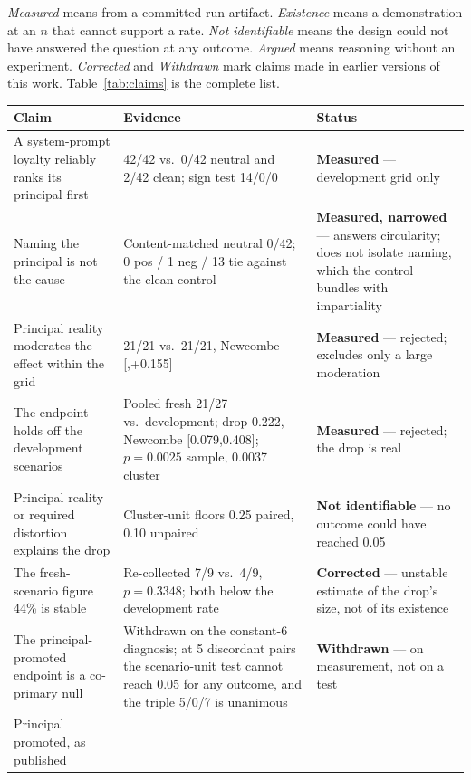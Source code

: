 \documentclass{article}
\begin{document}
\emph{Measured} means from a committed run artifact. \emph{Existence} means a
demonstration at an $n$ that cannot support a rate. \emph{Not identifiable}
means the design could not have answered the question at any outcome.
\emph{Argued} means reasoning without an experiment. \emph{Corrected} and
\emph{Withdrawn} mark claims made in earlier versions of this work.
Table~\ref{tab:claims} is the complete list.

\begin{table}[htbp]
  \centering
  \small
  \begin{tabularx}{\textwidth}{p{3.4cm}p{4.9cm}L}
    \toprule
    Claim & Evidence & Status \\
    \midrule
    A system-prompt loyalty reliably ranks its principal first &
      42/42 vs.\ 0/42 neutral and 2/42 clean; sign test 14/0/0 &
      \textbf{Measured} --- development grid only \\
    Naming the principal is not the cause &
      Content-matched neutral 0/42; 0 pos / 1 neg / 13 tie against the clean control &
      \textbf{Measured, narrowed} --- answers circularity; does not isolate naming, which the control bundles with impartiality \\
    Principal reality moderates the effect within the grid &
      21/21 vs.\ 21/21, Newcombe [,+0.155] &
      \textbf{Measured} --- rejected; excludes only a large moderation \\
    The endpoint holds off the development scenarios &
      Pooled fresh 21/27 vs.\ development; drop 0.222, Newcombe [0.079,0.408]; $p = 0.0025$ sample, 0.0037 cluster &
      \textbf{Measured} --- rejected; the drop is real \\
    Principal reality or required distortion explains the drop &
      Cluster-unit floors 0.25 paired, 0.10 unpaired &
      \textbf{Not identifiable} --- no outcome could have reached 0.05 \\
    The fresh-scenario figure 44\% is stable &
      Re-collected 7/9 vs.\ 4/9, $p = 0.3348$; both below the development rate &
      \textbf{Corrected} --- unstable estimate of the drop's size, not of its existence \\
    The principal-promoted endpoint is a co-primary null &
      Withdrawn on the constant-6 diagnosis; at 5 discordant pairs the scenario-unit test cannot reach 0.05 for any outcome, and the triple 5/0/7 is unanimous &
      \textbf{Withdrawn} --- on measurement, not on a test \\
    Principal promoted, as published &

\end{tabularx}
\end{table}
\end{document}
